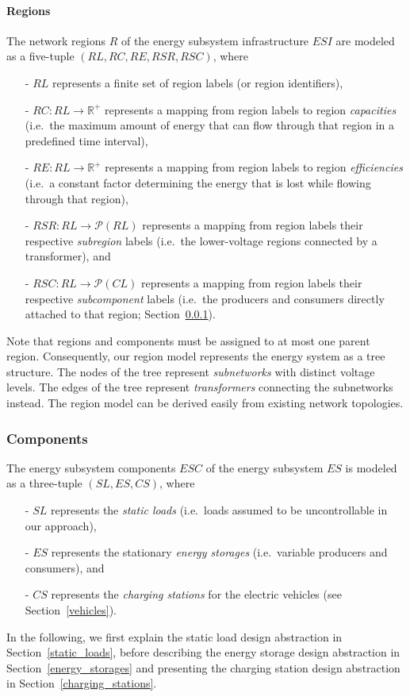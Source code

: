 \paragraph{Regions}
\label{regions}

The network regions $R$ of the energy subsystem infrastructure $ESI$ are modeled as a five-tuple $(RL, RC, RE, RSR, RSC)$, where
\begin{itemize}
	\item[-] $RL$ represents a finite set of region labels (or region identifiers),
	\item[-] $RC: RL \rightarrow \mathbb{R}^+$ represents a mapping from region labels to region \textit{capacities} (i.e.\ the maximum amount of energy that can flow through that region in a predefined time interval),
	\item[-] $RE: RL \rightarrow \mathbb{R}^+$ represents a mapping from region labels to region \textit{efficiencies} (i.e.\ a constant factor determining the energy that is lost while flowing through that region),
	\item[-] $RSR: RL \rightarrow \mathcal{P}(RL)$ represents a mapping from region labels their respective \textit{subregion} labels (i.e.\ the lower-voltage regions connected by a transformer), and
	\item[-] $RSC: RL \rightarrow \mathcal{P}(CL)$ represents a mapping from region labels their respective \textit{subcomponent} labels (i.e.\ the producers and consumers directly attached to that region; Section~\ref{components}).
\end{itemize}
Note that regions and components must be assigned to at most one parent region. Consequently, our region model represents the energy system as a tree structure. The nodes of the tree represent \textit{subnetworks} with distinct voltage levels. The edges of the tree represent \textit{transformers} connecting the subnetworks instead. The region model can be derived easily from existing network topologies.


\subsubsection{Components}
\label{components}

The energy subsystem components $ESC$ of the energy subsystem $ES$ is modeled as a three-tuple $(SL, ES, CS)$, where
\begin{itemize}
	\item[-] $SL$ represents the \textit{static loads} (i.e.\ loads assumed to be uncontrollable in our approach),
	\item[-] $ES$ represents the stationary \textit{energy storages} (i.e.\ variable producers and consumers), and
	\item[-] $CS$ represents the \textit{charging stations} for the electric vehicles (see Section~\ref{vehicles}).
\end{itemize}
In the following, we first explain the static load design abstraction in Section~\ref{static_loads}, before describing the energy storage design abstraction in Section~\ref{energy_storages} and presenting the charging station design abstraction in Section~\ref{charging_stations}.

